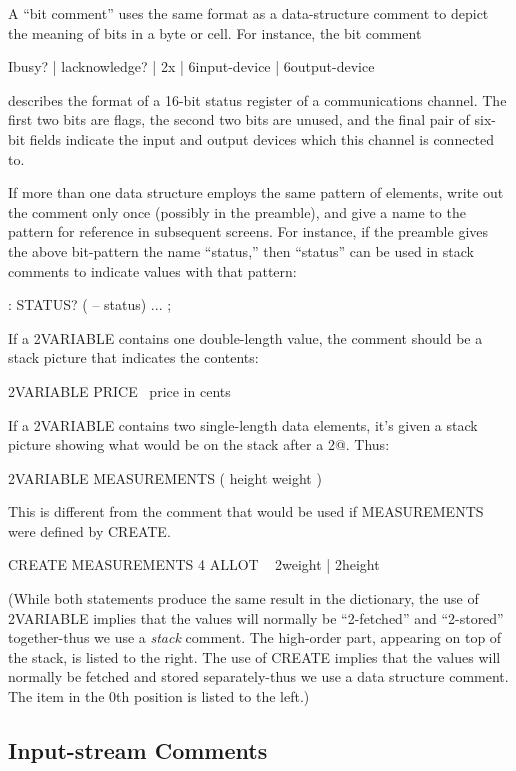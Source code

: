 A ``bit comment'' uses the same format as a data-structure comment
to depict the meaning of bits in a byte or cell.  For instance, the bit
comment
\begin{Code}
{ Ibusy? | lacknowledge? | 2x | 6input-device | 6output-device}
\end{Code}
describes the format of a 16-bit status register of a communications channel.
The first two bits are flags, the second two bits are unused, and the
final pair of six-bit fields indicate the input and output devices which this
channel is connected to.

If more than one data structure employs the same pattern of elements,
write out the comment only once (possibly in the preamble), and
give a name to the pattern for reference in subsequent screens.  For instance,
if the preamble gives the above bit-pattern the name ``status,''
then ``status'' can be used in stack comments to indicate values with that
pattern:
\begin{Code}
: STATUS?  ( -- status) ... ;
\end{Code}
If a 2VARIABLE contains one double-length value, the comment should
be a stack picture that indicates the contents:
\begin{Code}
2VARIABLE PRICE  \ price in cents
\end{Code}
If a 2VARIABLE contains two single-length data elements, it's given a
stack picture showing what would be on the stack after a 2@.  Thus:
\begin{Code}
2VARIABLE MEASUREMENTS  ( height weight )
\end{Code}
This is different from the comment that would be used if
MEASUREMENTS were defined by CREATE.
\begin{Code}
CREATE MEASUREMENTS 4 ALLOT  \ { 2weight | 2height }
\end{Code}
(While both statements produce the same result in the dictionary, the use
of 2VARIABLE implies that the values will normally be ``2-fetched'' and
``2-stored'' together-thus we use a \emph{stack} comment.  The high-order part,
appearing on top of the stack, is listed to the right.  The use of CREATE
implies that the values will normally be fetched and stored
separately-thus we use a data structure comment.  The item in the 0th
position is listed to the left.)

\subsection{Input-stream Comments}

